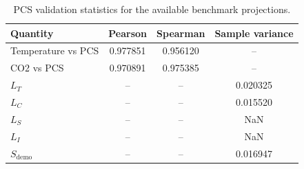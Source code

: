 \begin{table}[t]
\caption{\label{tab:validation_statistics}PCS validation statistics for the available benchmark projections.}
\begin{ruledtabular}
\begin{tabular}{lccc}
Quantity & Pearson & Spearman & Sample variance \\
\hline
Temperature vs PCS & 0.977851 & 0.956120 & -- \\
CO2 vs PCS & 0.970891 & 0.975385 & -- \\
$L_T$ & -- & -- & 0.020325 \\
$L_C$ & -- & -- & 0.015520 \\
$L_S$ & -- & -- & NaN \\
$L_I$ & -- & -- & NaN \\
$S_{\mathrm{demo}}$ & -- & -- & 0.016947 \\
\end{tabular}
\end{ruledtabular}
\end{table}
